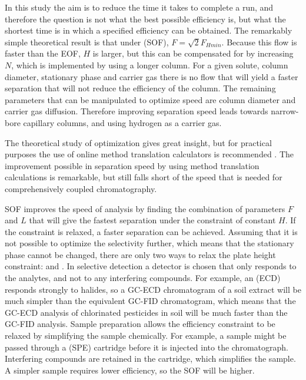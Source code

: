 In this study the aim is to reduce the time it takes to complete a run, and
therefore the question is not what the best possible efficiency is, but what the
shortest time is in which a specified efficiency can be obtained. The remarkably
simple theoretical result is that under  (SOF),
\(F = \sqrt{2}F_{Hmin}\). Because this flow is faster than the EOF, \(H\) is
larger, but this can be compensated for by increasing \(N\), which is
implemented by using a longer column. For a given solute, column diameter,
stationary phase and carrier gas there is no flow that will yield a faster
separation that will not reduce the efficiency of the column. The remaining
parameters that can be manipulated to optimize speed are column diameter and
carrier gas diffusion. Therefore improving separation speed leads towards
narrow-bore capillary columns, and using hydrogen as a carrier gas.

The theoretical study of optimization gives great insight, but for practical
purposes the use of online method translation calculators is recommended
\autocite{Restek2014}. The improvement possible in separation speed by using
method translation calculations is remarkable, but still falls short of the
speed that is needed for comprehensively coupled chromatography.

SOF improves the speed of analysis by finding the combination of parameters
\(F\) and \(L\) that will give the fastest separation under the constraint of
constant \(H\). If the constraint is relaxed, a faster separation can be
achieved. Assuming that it is not possible to optimize the selectivity further,
which means that the stationary phase cannot be changed, there are only two ways
to relax the plate height constraint:  and
. In selective detection a detector is chosen that
only responds to the analytes, and not to any interfering compounds. For
example, an  (ECD) responds strongly to
halides, so a GC-ECD chromatogram of a soil extract will be much simpler than
the equivalent GC-FID chromatogram, which means that the GC-ECD analysis of
chlorinated pesticides in soil will be much faster than the GC-FID analysis.
Sample preparation allows the efficiency constraint to be relaxed by simplifying
the sample chemically. For example, a sample might be passed through a
 (SPE) cartridge before it is injected into the
chromatograph. Interfering compounds are retained in the cartridge, which
simplifies the sample. A simpler sample requires lower efficiency, so the SOF
will be higher.

